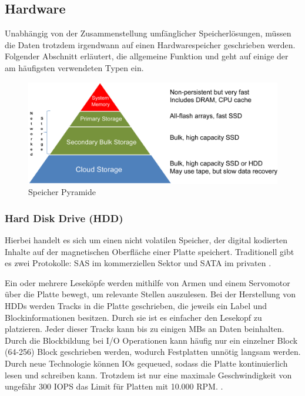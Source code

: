 \subsection{Hardware}

Unabhängig von der Zusammenstellung umfänglicher Speicherlösungen, müssen die Daten trotzdem irgendwann auf einen Hardwarespeicher geschrieben werden. Folgender Abschnitt erläutert, die allgemeine Funktion und geht auf einige der am häufigsten verwendeten Typen ein.


\begin{figure}[hbt]
	\centering
	\includegraphics[scale=0.75]{images/storage-pyramide}
	\caption{Speicher Pyramide \parencite{kaufmann.2016}}
	\label{fig:storagepyramide}
\end{figure}

\subsubsection{Hard Disk Drive (HDD)}

Hierbei handelt es sich um einen nicht volatilen Speicher, der digital kodierten Inhalte auf der magnetischen Oberfläche einer Platte speichert. Traditionell gibt es zwei Protokolle: SAS im kommerziellen Sektor und SATA im privaten \parencite{wikibooks.2016}.

Ein oder mehrere Leseköpfe werden mithilfe von Armen und einem Servomotor über die Platte bewegt, um relevante Stellen auszulesen. Bei der Herstellung von HDDs werden Tracks in die Platte geschrieben, die jeweils ein Label und Blockinformationen besitzen. Durch sie ist es einfacher den Lesekopf zu platzieren. Jeder dieser Tracks kann bis zu einigen MBs an Daten beinhalten. Durch die Blockbildung bei I/O Operationen kann häufig nur ein einzelner Block (64-256) Block geschrieben werden, wodurch Festplatten unnötig langsam werden. Durch neue Technologie können IOs gequeued, sodass die Platte kontinuierlich lesen und schreiben kann. Trotzdem ist nur eine maximale Geschwindigkeit von ungefähr 300 \gls{IOPS} das Limit für Platten mit 10.000 RPM.  \parencite{kaufmann.2016}.

